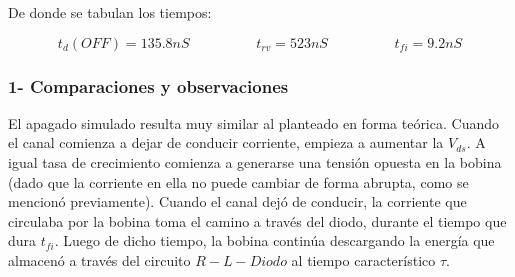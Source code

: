 \documentclass[e4_tp1_main.tex]{subfiles}
\begin{document}
De donde se tabulan los tiempos:

\[
t_d(OFF) = 135.8nS \hspace{2cm} t_{rv} = 523nS \hspace{2cm} t_{fi} = 9.2nS 
\]

\subsubsection*{1- Comparaciones y observaciones}
 
El apagado simulado resulta muy similar al planteado en forma teórica. Cuando el canal comienza a dejar de conducir corriente, empieza a aumentar la $V_{ds}$. A igual tasa de crecimiento comienza a generarse una tensión opuesta en la bobina (dado que la corriente en ella no puede cambiar de forma abrupta, como se mencionó previamente). Cuando el canal dejó de conducir, la corriente que circulaba por la bobina toma el camino a través del diodo, durante el tiempo que dura $t_{fi}$. Luego de dicho tiempo, la bobina continúa descargando la energía que almacenó a través del circuito $R-L-Diodo$ al tiempo característico $\tau$.
 
\newpage
\end{document}
